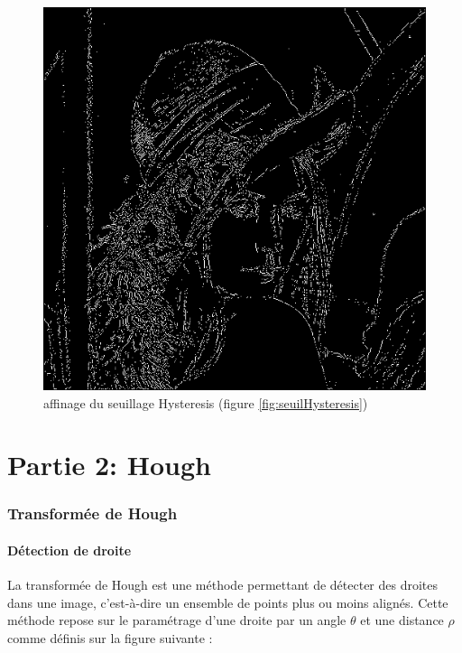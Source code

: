 \documentclass[11pt]{article}
\begin{document}
		\begin{figure}[H]
			\centering
			\includegraphics[scale=0.25]{Image/affinage.png}
			\caption{affinage du seuillage Hysteresis (figure \ref{fig:seuilHysteresis})}
			\label{fig:affinage}
		\end{figure} 


\part{Partie 2: Hough}

\section{Transformée de Hough}

	\subsection{Détection de droite}
	La transformée de Hough est une méthode permettant de détecter des droites dans
	une image, c'est-à-dire un ensemble de points plus ou moins alignés. Cette méthode
	repose sur le paramétrage d'une droite par un angle $\theta$ et une distance $\rho$ comme définis
	sur la figure suivante :
\end{document}
